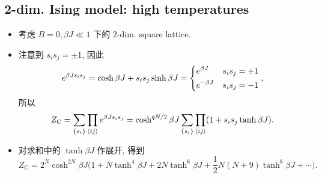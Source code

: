 \subsection{2-dim. Ising model: high temperatures}
\begin{itemize}
	\item 考虑 $B = 0, \beta J \ll 1$ 下的 2-dim. square lattice.
	
	\item 注意到 $s_i s_j = \pm 1$, 因此
	\begin{equation}
		e^{\beta J s_i s_j} = \cosh \beta J + s_i s_j \sinh \beta J = \begin{dcases}
			e^{\beta J} & s_i s_j = + 1 \\
			e^{- \beta J} & s_i s_j = - 1
		\end{dcases},
	\end{equation}
	所以
	\begin{equation}
		Z_\text{C} = \sum_{\{s_i\}} \prod_{\braket{i j}} e^{\beta J s_i s_j} = \cosh^{q N / 2} \beta J \sum_{\{s_i\}} \prod_{\braket{i j}} (1 + s_i s_j \tanh \beta J).
	\end{equation}
	
	\item 对求和中的 $\tanh \beta J$ 作展开, 得到
	\begin{equation}
		Z_\text{C} = 2^N \cosh^{2 N} \beta J \Big( 1 + N \tanh^4 \beta J + 2 N \tanh^6 \beta J + \frac{1}{2} N (N + 9) \tanh^8 \beta J + \cdots \Big).
	\end{equation}
	

\end{itemize}
